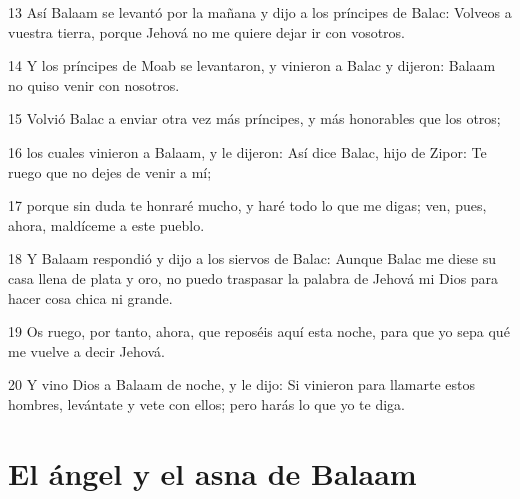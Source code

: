 \par 13 Así Balaam se levantó por la mañana y dijo a los príncipes de Balac: Volveos a vuestra tierra, porque Jehová no me quiere dejar ir con vosotros.
\par 14 Y los príncipes de Moab se levantaron, y vinieron a Balac y dijeron: Balaam no quiso venir con nosotros.
\par 15 Volvió Balac a enviar otra vez más príncipes, y más honorables que los otros;
\par 16 los cuales vinieron a Balaam, y le dijeron: Así dice Balac, hijo de Zipor: Te ruego que no dejes de venir a mí;
\par 17 porque sin duda te honraré mucho, y haré todo lo que me digas; ven, pues, ahora, maldíceme a este pueblo. 
\par 18 Y Balaam respondió y dijo a los siervos de Balac: Aunque Balac me diese su casa llena de plata y oro, no puedo traspasar la palabra de Jehová mi Dios para hacer cosa chica ni grande.
\par 19 Os ruego, por tanto, ahora, que reposéis aquí esta noche, para que yo sepa qué me vuelve a decir Jehová.
\par 20 Y vino Dios a Balaam de noche, y le dijo: Si vinieron para llamarte estos hombres, levántate y vete con ellos; pero harás lo que yo te diga.

\section*{El ángel y el asna de Balaam}

